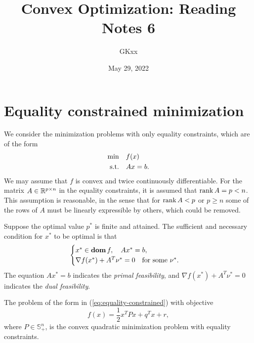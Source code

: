 \documentclass[12pt]{article}
\title{Convex Optimization: Reading Notes 6}
\author{GKxx}
\date{May 29, 2022}
\begin{document}
\maketitle

\section{Equality constrained minimization}

We consider the minimization problems with only equality constraints, which are of the form
\begin{equation}\label{eq:equality-constrained}
    \begin{aligned}
        \min\quad &f(x)\\
        \textnormal{s.t.}\quad &Ax=b.
    \end{aligned}
\end{equation}
We may assume that \(f\) is convex and twice continuously differentiable. For the matrix \(A\in\mathbb R^{p\times n}\) in the equality constraints, it is assumed that \(\operatorname{rank} A=p<n\). This assumption is reasonable, in the sense that for \(\operatorname{rank} A<p\) or \(p\geqslant n\) some of the rows of \(A\) must be linearly expressible by others, which could be removed.

Suppose the optimal value \(p^\ast\) is finite and attained. The sufficient and necessary condition for \(x^\ast\) to be optimal is that
\[\begin{cases}
    x^\ast\in\operatorname{\mathbf{dom}} f,\quad Ax^\ast=b,\\
    \nabla f(x^\ast)+A^T\nu^\ast=0\quad\text{for some }\nu^\ast.
\end{cases}\]
The equation \(Ax^\ast=b\) indicates the \textit{primal feasibility}, and \(\nabla f(x^\ast)+A^T\nu^\ast=0\) indicates the \textit{dual feasibility}.

\begin{example}
    The problem of the form in (\ref{eq:equality-constrained}) with objective
    \[f(x)=\frac12x^TPx+q^Tx+r,\]
    where \(P\in\mathbb S_+^n\), is the convex quadratic minimization problem with equality constraints.
\end{example}
\end{document}
